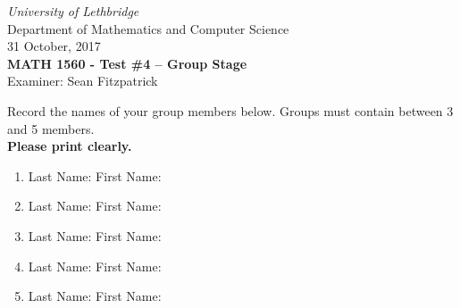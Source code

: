 \documentclass[12pt]{article}
\newcommand{\skipline}{\vspace{12pt}}
\begin{document}
\author{Instructor: Sean Fitzpatrick}
\thispagestyle{plain}
\begin{center}
\emph{University of Lethbridge}\\
Department of Mathematics and Computer Science\\
31 October, 2017\\
{\bf MATH 1560 - Test \#4 -- Group Stage}\\
Examiner: Sean Fitzpatrick
\end{center}

\skipline \skipline \skipline \noindent \skipline

Record the names of your group members below. Groups must contain between 3 and 5 members. \\

\textbf{Please print clearly.}

\skipline

\begin{enumerate}
\item Last Name:\underline{\hspace{200pt}} \quad First Name:\underline{\hspace{140pt}}

\skipline\skipline

\item Last Name:\underline{\hspace{200pt}} \quad First Name:\underline{\hspace{140pt}}

\skipline\skipline

\item Last Name:\underline{\hspace{200pt}} \quad First Name:\underline{\hspace{140pt}}

\skipline\skipline

\item Last Name:\underline{\hspace{200pt}} \quad First Name:\underline{\hspace{140pt}}

\skipline\skipline

\item Last Name:\underline{\hspace{200pt}} \quad First Name:\underline{\hspace{140pt}}

\end{enumerate}
%
\end{document}

